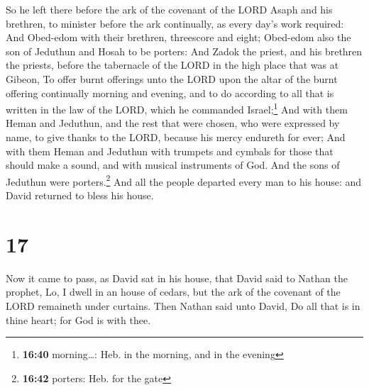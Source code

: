  So he left there before the ark of the covenant of the
LORD Asaph and his brethren, to minister before the ark continually, as
every day's work required:  And Obed-edom with their
brethren, threescore and eight; Obed-edom also the son of Jeduthun and
Hosah to be porters:  And Zadok the priest, and his
brethren the priests, before the tabernacle of the LORD in the high
place that was at Gibeon,  To offer burnt offerings unto
the LORD upon the altar of the burnt offering continually morning and
evening, and to do according to all that is written in the law of the
LORD, which he commanded Israel;\footnote{\textbf{16:40} morning\ldots:
  Heb. in the morning, and in the evening}  And with them
Heman and Jeduthun, and the rest that were chosen, who were expressed by
name, to give thanks to the LORD, because his mercy endureth for ever;
 And with them Heman and Jeduthun with trumpets and
cymbals for those that should make a sound, and with musical instruments
of God. And the sons of Jeduthun were porters.\footnote{\textbf{16:42}
  porters: Heb. for the gate}  And all the people
departed every man to his house: and David returned to bless his house.

\hypertarget{section-16}{%
\section{17}\label{section-16}}

 Now it came to pass, as David sat in his house, that
David said to Nathan the prophet, Lo, I dwell in an house of cedars, but
the ark of the covenant of the LORD remaineth under curtains.
 Then Nathan said unto David, Do all that is in thine
heart; for God is with thee.

